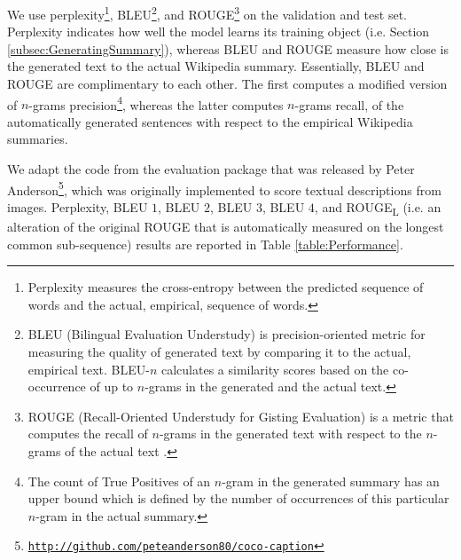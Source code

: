 \documentclass[preprint,5p]{elsarticle}
\begin{document}
We use perplexity\footnote{Perplexity measures the cross-entropy between the predicted sequence of words and the actual, empirical, sequence of words.}, BLEU\footnote{BLEU (Bilingual Evaluation Understudy) \cite{Papineni2002} is precision-oriented metric for measuring the quality of generated text by comparing it to the actual, empirical text. BLEU-$n$ calculates a similarity scores based on the co-occurrence of up to $n$-grams in the generated and the actual text.}, and ROUGE\footnote{ROUGE (Recall-Oriented Understudy for Gisting Evaluation) is a metric that computes the recall of $n$-grams in the generated text with respect to the $n$-grams of the actual text \cite{Lin2004}.} on the validation and test set. Perplexity indicates how well the model learns its training object (i.e. Section \ref{subsec:GeneratingSummary}), whereas BLEU and ROUGE measure how close is the generated text to the actual Wikipedia summary. Essentially, BLEU and ROUGE are complimentary to each other. The first computes a modified version of $n$-grams precision\footnote{The count of True Positives of an $n$-gram in the generated summary has an upper bound which is defined by the number of occurrences of this particular $n$-gram in the actual summary.}, whereas the latter computes $n$-grams recall, of the automatically generated sentences with respect to the empirical Wikipedia summaries.




We adapt the code from the evaluation package that was released by Peter Anderson\footnote{\href{https://github.com/peteanderson80/coco-caption}{\texttt{http://github.com/peteanderson80/coco-caption}}}, which was originally implemented to score textual descriptions from images. Perplexity, BLEU $1$, BLEU $2$, BLEU $3$, BLEU $4$, and ROUGE\textsubscript{L} (i.e. an alteration of the original ROUGE that is automatically measured on the longest common sub-sequence) results are reported in Table \ref{table:Performance}.
\end{document}
